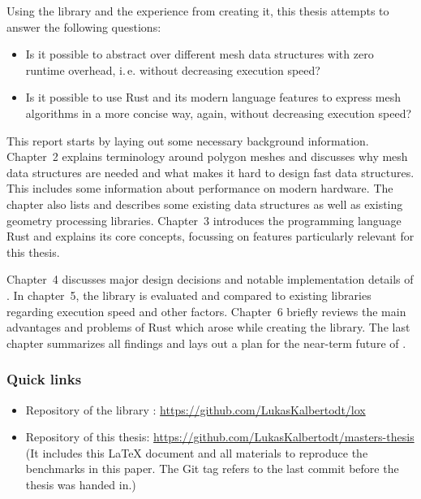 \newpage

Using the library  and the experience from creating it, this thesis attempts to answer the following questions:

\begin{itemize}
  \item Is it possible to abstract over different mesh data structures with zero runtime overhead, i.\,e. without decreasing execution speed?
  \item Is it possible to use Rust and its modern language features to express mesh algorithms in a more concise way, again, without decreasing execution speed?
\end{itemize}


\vspace{1cm}

This report starts by laying out some necessary background information.
Chapter~2 explains terminology around polygon meshes and discusses why mesh data structures are needed and what makes it hard to design fast data structures.
This includes some information about performance on modern hardware.
The chapter also lists and describes some existing data structures as well as existing geometry processing libraries.
Chapter~3 introduces the programming language Rust and explains its core concepts, focussing on features particularly relevant for this thesis.

Chapter~4 discusses major design decisions and notable implementation details of .
In chapter~5, the library is evaluated and compared to existing libraries regarding execution speed and other factors.
Chapter~6 briefly reviews the main advantages and problems of Rust which arose while creating the library.
The last chapter summarizes all findings and lays out a plan for the near-term future of .


\vfill

\subsubsection*{Quick links}
\begin{itemize}
  \item Repository of the library : \textcolor{link-blue}{\url{https://github.com/LukasKalbertodt/lox}}
  \item Repository of this thesis: \textcolor{link-blue}{\url{https://github.com/LukasKalbertodt/masters-thesis}}\\
  {\footnotesize (It includes this \LaTeX{} document and all materials to reproduce the benchmarks in this paper.
  The Git tag  refers to the last commit before the thesis was handed in.)}
\end{itemize}

\vspace{2cm}
